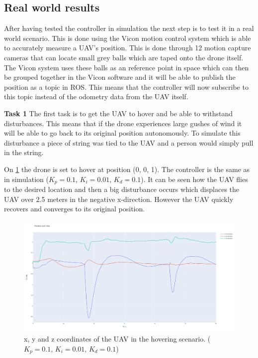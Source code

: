 \documentclass[conference]{IEEEtran}
\begin{document}
\subsection{Real world results}
After having tested the controller in simulation the next step is to test it in a real world scenario. This is done using the Vicon motion control system which is able to accurately measure a UAV's position. This is done through 12 motion capture cameras that can locate small grey balls which are taped onto the drone itself. The Vicon system uses these balls as an reference point in space which can then be grouped together in the Vicon software and it will be able to publish the position as a topic in ROS. This means that the controller will now subscribe to this topic instead of the odometry data from the UAV itself.

\textbf{Task 1}
The first task is to get the UAV to hover and be able to withstand disturbances. This means that if the drone experiences large gushes of wind it will be able to go back to its original position autonomously. To simulate this disturbance a piece of string was tied to the UAV and a person would simply pull in the string.

On \cref{fig:task1_10_pos} the drone is set to hover at position (0, 0, 1). The controller is the same as in simulation ($K_p = 0.1$, $K_i = 0.01$, $K_d = 0.1$). It can be seen how the UAV flies to the desired location and then a big disturbance occurs which displaces the UAV over 2.5 meters in the negative x-direction. However the UAV quickly recovers and converges to its original position.  

\begin{figure}[hbtp]
	\centering
	\includegraphics[width=1.0\linewidth]{images/task1_10_pos.png}
	\caption{x, y and z coordinates of the UAV in the hovering scenario. ($K_p = 0.1$, $K_i = 0.01$, $K_d = 0.1$)}
	\label{fig:task1_10_pos}
\end{figure}
\end{document}
